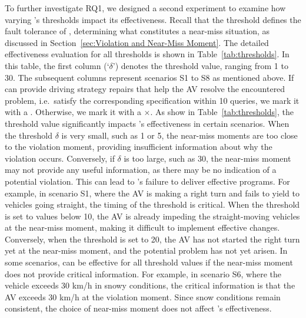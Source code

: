 To further investigate RQ1, we designed a second experiment to examine how varying \coolname's thresholds impact its effectiveness. Recall that the threshold defines the fault tolerance of \coolname, determining what constitutes a near-miss situation, as discussed in Section~\ref{sec:Violation and Near-Miss Moment}. The detailed effectiveness evaluation for all thresholds is shown in Table~\ref{tab:thresholds}. In this table, the first column (`$\delta$') denotes the threshold value, ranging from 1 to 30. The subsequent columns represent scenarios S1 to S8 as mentioned above. If \coolname can provide driving strategy repairs that help the AV resolve the encountered problem, i.e.~satisfy the corresponding specification within 10 queries, we mark it with a \checkmark. Otherwise, we mark it with a $\times$. 
As show in Table~\ref{tab:thresholds}, the threshold value significantly impacts \coolname's effectiveness in certain scenarios. When the threshold $\delta$ is very small, such as 1 or 5, the near-miss moments are too close to the violation moment, providing insufficient information about why the violation occurs. Conversely, if $\delta$ is too large, such as 30, the near-miss moment may not provide any useful information, as there may be no indication of a potential violation. This can lead to \coolname's failure to deliver effective programs.
For example, in scenario S1, where the AV is making a right turn and fails to yield to vehicles going straight, the timing of the threshold is critical. When the threshold is set to values below 10, the AV is already impeding the straight-moving vehicles at the near-miss moment, making it difficult to implement effective changes. Conversely, when the threshold is set to 20, the AV has not started the right turn yet at the near-miss moment, and the potential problem has not yet arisen. In some scenarios, \coolname can be effective for all threshold values if the near-miss moment does not provide critical information. For example, in scenario S6, where the vehicle exceeds 30 km/h in snowy conditions, the critical information is that the AV exceeds 30 km/h at the violation moment. Since snow conditions remain consistent, the choice of near-miss moment does not affect \coolname's effectiveness.

